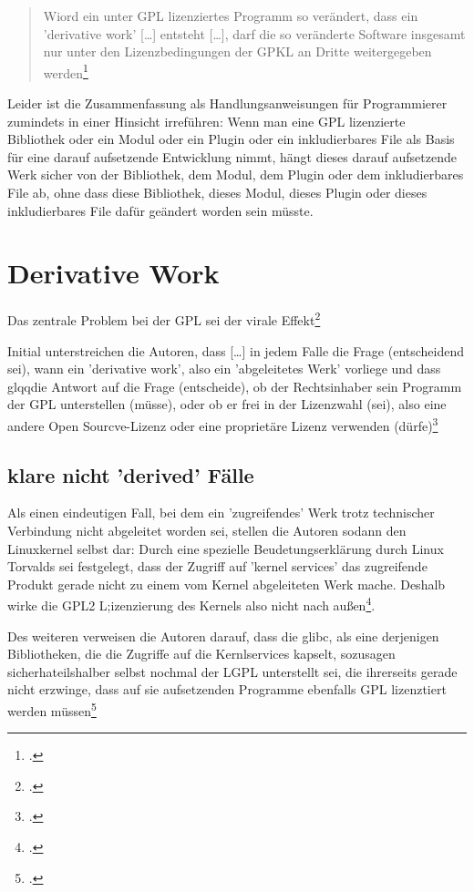 \documentclass[DIV=calc,BCOR=5mm,11pt,headings=small,oneside,abstract=true, toc=bib]{scrartcl}
\begin{document}
\begin{quote}
\glqq{}Wiord ein unter GPL lizenziertes Programm so verändert, dass ein
'derivative work' [\ldots] entsteht [\ldots], darf die so veränderte Software
insgesamt nur unter den Lizenzbedingungen der GPKL an Dritte weitergegeben
werden\grqq{}\footcite[cf.][17]{ifross2005a}
\end{quote}

Leider ist die Zusammenfassung als Handlungsanweisungen für Programmierer
zumindets in einer Hinsicht irreführen: Wenn man eine GPL lizenzierte Bibliothek
oder ein Modul oder ein Plugin oder ein inkludierbares File als Basis für eine
darauf aufsetzende Entwicklung nimmt, hängt dieses darauf aufsetzende Werk
sicher von der Bibliothek, dem Modul, dem Plugin oder dem inkludierbares File
ab, ohne dass diese Bibliothek, dieses Modul, dieses Plugin oder dieses
inkludierbares File dafür geändert worden sein müsste.

\section{Derivative Work}

Das zentrale Problem bei der GPL sei der \glqq{}virale
Effekt\grqq{}\footcite[cf.][64]{ifross2005a}

Initial unterstreichen die Autoren, dass \glqq{}[\ldots] in jedem Falle die
Frage (entscheidend sei), wann  ein 'derivative work', also ein 'abgeleitetes
Werk' vorliege\grqq{} und dass glqq{}die Antwort auf die Frage (entscheide), ob
der Rechtsinhaber sein Programm der GPL unterstellen (müsse), oder ob er frei in
der Lizenzwahl (sei), also eine andere Open Sourcve-Lizenz oder eine proprietäre
Lizenz verwenden (dürfe)\grqq{}\footcite[cf.][64]{ifross2005a}

\subsection{klare nicht 'derived' Fälle}
Als einen eindeutigen Fall, bei dem ein 'zugreifendes' Werk trotz technischer
Verbindung nicht abgeleitet worden sei, stellen die Autoren sodann den
Linuxkernel selbst dar: Durch eine spezielle Beudetungserklärung durch Linux
Torvalds sei festgelegt, dass der Zugriff auf 'kernel services' das zugreifende
Produkt gerade nicht zu einem vom Kernel abgeleiteten Werk mache. Deshalb wirke
die GPL2 L;izenzierung des Kernels also nicht nach
außen\footcite[cf.][66]{ifross2005a}.

Des weiteren verweisen die Autoren darauf, dass die glibc, als eine derjenigen
Bibliotheken, die die Zugriffe auf die Kernlservices kapselt, sozusagen
sicherhateilshalber selbst nochmal der LGPL unterstellt sei, die ihrerseits
gerade nicht erzwinge, dass auf sie aufsetzenden Programme ebenfalls GPL
lizenztiert werden müssen\footcite[cf.][66]{ifross2005a}
\end{document}
